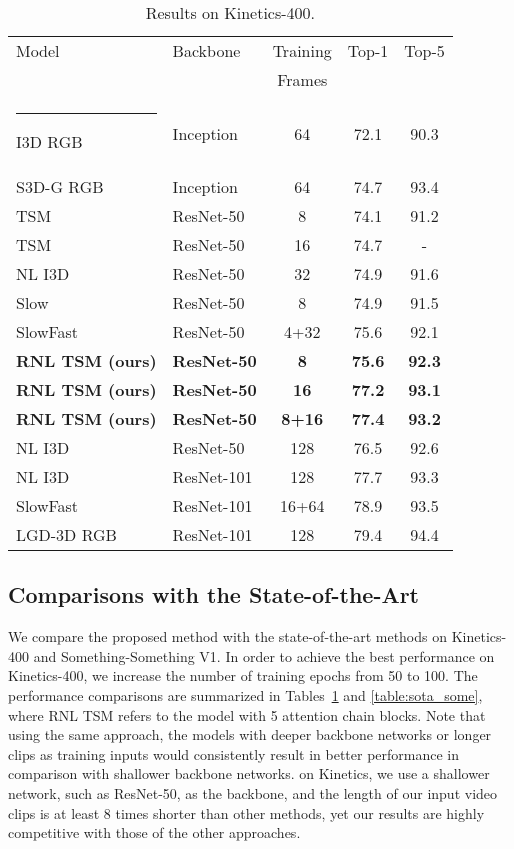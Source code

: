 \documentclass[a4paper,conference]{IEEEtran}
\makeatletter
\newcommand{\thickhline}{\noalign {\ifnum 0=`}\fi \hrule height 1pt
    \futurelet \reserved@a \@xhline
}
\makeatother
\begin{document}
\begin{table}
\caption{Results on Kinetics-400.}
\label{table:sota}
\centering
\setlength{\tabcolsep}{7.8pt}
\begin{tabular}{llccc}
 Model & Backbone & Training & Top-1 & Top-5 \\
      &           & Frames    &  &\\
\thickhline
I3D RGB \cite{carreira2017quo} & Inception &64 & 72.1 & 90.3\\
S3D-G RGB \cite{xie2018rethinking} & Inception & 64 & 74.7 & 93.4\\
TSM \cite{lin2019tsm} & ResNet-50 & 8 & 74.1& 91.2 \\
 TSM \cite{lin2019tsm} & ResNet-50 & 16 & 74.7& - \\
NL I3D \cite{wang2018non} & ResNet-50 & 32 & 74.9 & 91.6 \\
Slow \cite{feichtenhofer2019slowfast} & ResNet-50 & 8 & 74.9 & 91.5\\
SlowFast \cite{feichtenhofer2019slowfast} & ResNet-50 & 4+32 & 75.6 & 92.1\\
\textbf{RNL TSM (ours)} & \textbf{ResNet-50} & \textbf{8} & \textbf{75.6} & \textbf{92.3} \\
\textbf{RNL TSM (ours)} & \textbf{ResNet-50} & \textbf{16} & \textbf{77.2} & \textbf{93.1} \\
\textbf{RNL TSM (ours)} & \textbf{ResNet-50} & \textbf{8+16} & \textbf{77.4} & \textbf{93.2} \\
NL I3D \cite{wang2018non} & ResNet-50 & 128 & 76.5& 92.6 \\
NL I3D \cite{wang2018non} & ResNet-101 & 128 & 77.7& 93.3 \\
SlowFast \cite{feichtenhofer2019slowfast} & ResNet-101 & 16+64 & 78.9 & 93.5\\
LGD-3D RGB \cite{qiu2019learning} & ResNet-101 & 128 & 79.4 & 94.4 \\
\end{tabular}
\end{table}


\subsection{Comparisons with the State-of-the-Art}
We compare the proposed method with the state-of-the-art methods on Kinetics-400 and Something-Something V1. In order to achieve the best performance on Kinetics-400, we increase the number of training epochs from 50 to 100. The performance comparisons are summarized in Tables~\ref{table:sota} and \ref{table:sota_some}, where RNL TSM refers to the model with 5 attention chain blocks. Note that using the same approach, the models with deeper backbone networks or longer clips as training inputs would consistently result in better performance in comparison with shallower backbone networks. on Kinetics, we use a shallower network, such as ResNet-50, as the backbone, and the length of our input video clips is at least 8 times shorter than other methods, yet our results are highly competitive with those of the other approaches. 
\end{document}
